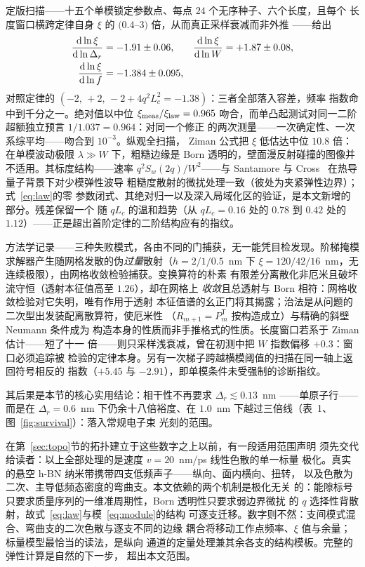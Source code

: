 \documentclass[11pt]{article}
\begin{document}
定版扫描——十五个单模锁定参数点、每点 $24$ 个无序种子、六个长度，且每个
长度窗口横跨定律自身 $\xi$ 的 $(0.4$--$3)$ 倍，从而真正采样衰减而非外推
——给出
\begin{align}
\frac{{\rm d}\ln\xi}{{\rm d}\ln\Delta_r} &= -1.91 \pm 0.06, &
\frac{{\rm d}\ln\xi}{{\rm d}\ln W} &= +1.87 \pm 0.08,\nonumber\\
\frac{{\rm d}\ln\xi}{{\rm d}\ln f} &= -1.384 \pm 0.095,
\end{align}
对照定律的 $(-2,\,+2,\,-2+4q^2L_c^2 = -1.38)$：三者全部落入容差，频率
指数命中到千分之一。绝对值以中位 $\xi_{\rm meas}/\xi_{\rm law} = 0.965$
吻合，而单凸起测试对同一二阶超额独立预言 $1/1.037 = 0.964$：对同一个修正
的两次测量——一次确定性、一次系综平均——吻合到 $10^{-3}$。纵观全扫描，
Ziman 公式把 $\xi$ 低估达中位 $10.8$ 倍：在单模波动极限 $\lambda \gg W$
下，粗糙边缘是 Born 透明的，壁面漫反射碰撞的图像并不适用。其标度结构——速率 $q^2 S_w(2q)/W^2$——与
Santamore 与 Cross~\cite{santamore2001} 在热导量子背景下对少模弹性波导
粗糙度散射的微扰处理一致（彼处为夹紧弹性边界）；式~\eqref{eq:law}的零
参数闭式、其绝对归一以及深入局域化区的验证，是本文新增的部分。残差保留一个
随 $qL_c$ 的温和趋势（从 $qL_c = 0.16$ 处的 $0.78$ 到 $0.42$ 处的
$1.12$）——正是超出首阶定律的二阶结构应有的指纹。

方法学记录——三种失败模式，各由不同的门捕获，无一能凭目检发现。阶梯掩模
求解器产生随网格发散的伪\emph{过量}散射（$h = 2/1/0.5$~nm 下
$\xi = 120/42/16$~nm，无连续极限），由网格收敛检验捕获。变换算符的朴素
有限差分离散化非厄米且破坏流守恒（透射本征值高至 $1.26$），却在网格上
\emph{收敛}且总透射与 Born 相符：网格收敛检验对它失明，唯有作用于透射
本征值谱的幺正门将其揭露；治法是从问题的二次型出发装配离散算符，使厄米性
（$R_{m+1} = P_m^{\mathsf T}$ 按构造成立）与精确的斜壁 Neumann 条件成为
构造本身的性质而非手推格式的性质。长度窗口若系于 Ziman 估计——短了十一
倍——则只采样浅衰减，曾在初测中把 $W$ 指数偏移 $+0.3$：窗口必须追踪被
检验的定律本身。另有一次梯子跨越横模阈值的扫描在同一轴上返回符号相反的
指数（$+5.45$ 与 $-2.91$），即单模条件未受强制的诊断指纹。

其后果是本节的核心实用结论：相干性不再要求 $\Delta_r \lesssim 0.13$~nm
——单原子行——而是在 $\Delta_r = 0.6$~nm 下仍余十八倍裕度、在
$1.0$~nm 下越过三倍线（表~1、图~\ref{fig:survival}）：落入常规电子束
光刻的范围。

在第~\ref{sec:topo}节的拓扑建立于这些数字之上以前，有一段适用范围声明
须先交代给读者：以上全部处理的是速度 $v = 20$~nm/ps 线性色散的单一标量
极化。真实的悬空 h-BN 纳米带携带四支低频声子——纵向、面内横向、扭转，
以及色散为二次、主导低频态密度的弯曲支。本文依赖的两个机制是极化无关
的：能隙标号只要求质量序列的一维准周期性，Born 透明性只要求弱边界微扰
的 $q$ 选择性背散射，故式~\eqref{eq:law}与模~\eqref{eq:module}的结构
可逐支迁移。数字则不然：支间模式混合、弯曲支的二次色散与逐支不同的边缘
耦合将移动工作点频率、$\xi$ 值与余量；标量模型最恰当的读法，是纵向
通道的定量处理兼其余各支的结构模板。完整的弹性计算是自然的下一步，
超出本文范围。
\end{document}
